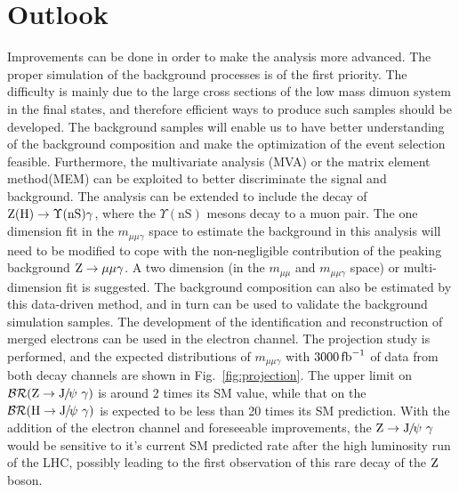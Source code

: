 \section{Outlook}
Improvements can be done in order to make the analysis more advanced. The proper simulation of the background processes is of the first priority. The difficulty is mainly due to the large cross sections of the low mass dimuon system in the final states, and therefore efficient ways to produce such samples should be developed. The background samples will enable us to have better understanding of the background composition and make the optimization of the event selection feasible. Furthermore, the multivariate analysis (MVA) or the matrix element method\footnotemark (MEM) can be exploited to better discriminate the signal and background. 
The analysis can be extended to include the decay of $\mathrm{Z}(\mathrm{H})\to\Upsilon(\text{nS})\gamma$, where the $\Upsilon(\text{nS})$ mesons decay to a muon pair.  The one dimension fit in the $m_{\mu\mu\gamma}$ space to estimate the background in this analysis will need to be modified to cope with the non-negligible contribution of the peaking background $\mathrm{Z}\to\mu\mu\gamma$. A two dimension (in the $m_{\mu\mu}$ and $m_{\mu\mu\gamma}$ space) or multi-dimension fit is suggested. The background composition can also be estimated by this data-driven method, and in turn can be used to validate the background simulation samples. The development of the identification and reconstruction of merged electrons can be used in the electron channel. The projection study is performed, and the expected distributions of $m_{\mu\mu\gamma}$ with $3000\mbox{\ensuremath{\,\text{fb}^\text{$-$1}}}$ of data from both decay channels are shown in Fig.~\ref{fig:projection}. The upper limit on $\mathcal{BR}(\mathrm{Z}\to{\mathrm{J}\hspace{-.08em}/\hspace{-.14em}\psi}\ \gamma)$ is around 2 times its SM value, while that on the $\mathcal{BR}(\mathrm{H}\to{\mathrm{J}\hspace{-.08em}/\hspace{-.14em}\psi}\ \gamma)$ is expected to be less than 20 times its SM prediction. With the addition of the electron channel and foreseeable improvements, the $\mathrm{Z}\to{\mathrm{J}\hspace{-.08em}/\hspace{-.14em}\psi}\ \gamma$ would be sensitive to it's current SM predicted rate after the high luminosity run of the LHC, possibly leading to the first observation of this rare decay of the $\mathrm{Z}$ boson.

